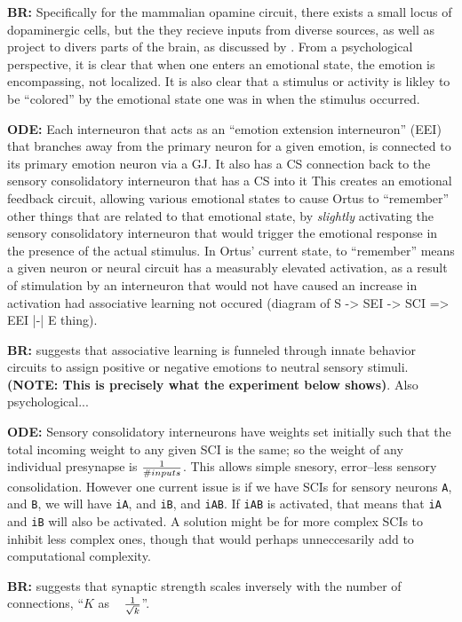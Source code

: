 \documentclass[letterpaper]{article}
\begin{document}
\textbf{BR:} Specifically for the mammalian opamine circuit, there exists a small locus of dopaminergic cells, but the they recieve inputs from diverse sources, as well as project to divers parts of the brain, as discussed by \citet{Beir2015}. From a psychological perspective, it is clear that when one enters an emotional state, the emotion is encompassing, not localized. It is also clear that a stimulus or activity is likley to be ``colored'' by the emotional state one was in when the stimulus occurred.

\textbf{ODE:} Each interneuron that acts as an ``emotion extension interneuron'' (EEI) that branches away from the primary neuron for a given emotion, is connected to its primary emotion neuron via a GJ.
It also has a CS connection back to the sensory consolidatory interneuron that has a CS into it
This creates an emotional feedback circuit, allowing various emotional states to cause Ortus to ``remember'' other things that are related to that emotional state, by \textit{slightly} activating the sensory consolidatory interneuron that would trigger the emotional response in the presence of the actual stimulus. In Ortus' current state, to ``remember'' means a given neuron or neural circuit has a measurably elevated activation, as a result of stimulation by an interneuron that would not have caused an increase in activation  had associative learning not occured (diagram of S -> SEI -> SCI => EEI |-| E thing).

\textbf{BR:} \citet{Gore2015} suggests that associative learning is funneled through innate behavior circuits to assign positive or negative emotions to neutral sensory stimuli. \textbf{(NOTE: This is precisely what the experiment below shows)}. Also psychological...

\textbf{ODE:} Sensory consolidatory interneurons have weights set initially such that the total incoming weight to any given SCI is the same; so the weight of any individual presynapse is $ 1 \over {\#inputs}$. This allows simple snesory, error--less sensory consolidation. However one current issue is if we have SCIs for sensory neurons \texttt{A}, and \texttt{B}, we will have \texttt{iA}, and \texttt{iB}, and \texttt{iAB}. If \texttt{iAB} is activated, that means that \texttt{iA} and \texttt{iB} will also be activated. A solution might be for more complex SCIs to inhibit less complex ones, though that would perhaps unneccesarily add to computational complexity.


\textbf{BR:} \citet{Barral2016} suggests that synaptic strength scales inversely with the number of connections, ``$K$ as ~ $1 \over \sqrt{k}$''. 
\end{document}
